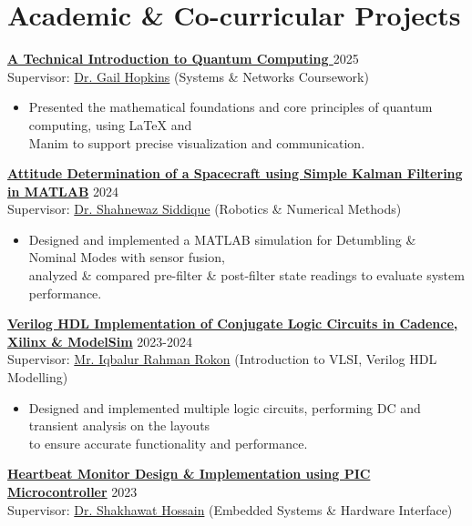 \documentclass[11pt,a4paper]{article}
\newcommand{\researchexperienceitem}[3]{
  \textbf{#1} \hfill {\footnotesize{#3}} \\
  #2
}
\begin{document}
\section*{Academic \& Co-curricular Projects}

\researchexperienceitem{{\href{https://drive.google.com/file/d/1riy1vmYbKUP7uW6G0pHn2b062nwcWHVF/view?usp=sharing}{A Technical Introduction to Quantum Computing }}}{Supervisor: {\href{https://scholar.google.com/citations?hl=en&user=2HYoslMAAAAJ}{Dr. Gail Hopkins}} (Systems \& Networks Coursework)}{2025}
  \begin{itemize}
    \item Presented the mathematical foundations and core principles of quantum computing,  using LaTeX and \\Manim to support precise visualization and communication.
    \end{itemize}
\researchexperienceitem
  {\href{https://drive.google.com/file/d/1H5tbD_JmRvl__UqDHD4sPWXwMc_bIxhD/view?usp=sharing}{Attitude Determination of a Spacecraft using Simple Kalman Filtering in MATLAB}}
  {Supervisor: \href{https://scholar.google.com/citations?hl=en&user=6XLqr5QAAAAJ}{Dr. Shahnewaz Siddique} (Robotics \& Numerical Methods)}
  {2024}
  \begin{itemize}
    \item Designed and implemented a MATLAB simulation for Detumbling \& Nominal Modes with sensor fusion, \\analyzed \& compared pre-filter \& post-filter state readings to evaluate system performance.
  \end{itemize}
\researchexperienceitem{\href{https://drive.google.com/drive/folders/1z_m9oPKGY4GZCL-_jfyNqZMk-NUp1QEf}{Verilog HDL Implementation of Conjugate Logic Circuits in Cadence, Xilinx \& ModelSim}}
  {Supervisor: \href{https://ece.northsouth.edu/people/iqbalur-rokon/}{Mr. Iqbalur Rahman Rokon} (Introduction to VLSI, Verilog HDL Modelling)}{2023-2024}
  \begin{itemize}
    \item Designed and implemented multiple logic circuits, performing DC and transient analysis on the layouts \\to ensure accurate functionality and performance.
  \end{itemize}
\researchexperienceitem{{\href{https://drive.google.com/file/d/1cp2u4pVswKNNHZNCnw1QEQHbvuv3dpvr/view}{Heartbeat Monitor Design \& Implementation using PIC Microcontroller}}}{Supervisor: {\href{https://ece.northsouth.edu/people/dr-sakhawat-hussain/}{Dr. Shakhawat Hossain}} (Embedded Systems \& Hardware Interface)}{2023}
\end{document}

